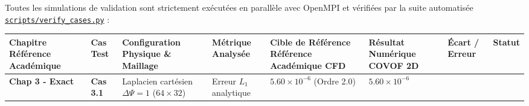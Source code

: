 \documentclass[
  french,
]{article}
\newcounter{none} %
\begin{document}
Toutes les simulations de validation sont strictement exécutées en
parallèle avec OpenMPI et vérifiées par la suite automatisée
\href{scripts/verify_cases.py}{\texttt{scripts/verify\_cases.py}} :

{\def\LTcaptype{none} %
\begin{longtable}[]{@{}
  >{\raggedright\arraybackslash}p{}
  >{\raggedright\arraybackslash}p{}
  >{\raggedright\arraybackslash}p{}
  >{\raggedright\arraybackslash}p{}
  >{\raggedright\arraybackslash}p{}
  >{\raggedright\arraybackslash}p{}
  >{\raggedright\arraybackslash}p{}
  >{\centering\arraybackslash}p{}@{}}
\toprule\noalign{}
\begin{minipage}[b]{\linewidth}\raggedright
Chapitre Référence Académique
\end{minipage} & \begin{minipage}[b]{\linewidth}\raggedright
Cas Test
\end{minipage} & \begin{minipage}[b]{\linewidth}\raggedright
Configuration Physique \& Maillage
\end{minipage} & \begin{minipage}[b]{\linewidth}\raggedright
Métrique Analysée
\end{minipage} & \begin{minipage}[b]{\linewidth}\raggedright
Cible de Référence Référence Académique CFD
\end{minipage} & \begin{minipage}[b]{\linewidth}\raggedright
Résultat Numérique COVOF 2D
\end{minipage} & \begin{minipage}[b]{\linewidth}\raggedright
Écart / Erreur
\end{minipage} & \begin{minipage}[b]{\linewidth}\centering
Statut
\end{minipage} \\
\midrule\noalign{}
\endhead
\bottomrule\noalign{}
\endlastfoot
\textbf{Chap 3 - Exact} & \textbf{Cas 3.1} & Laplacien cartésien
\(\Delta \Psi = 1\) (\(64 \times 32\)) & Erreur \(L_1\) analytique &
\(5.60 \times 10^{-6}\) (Ordre 2.0) & \(5.60 \times 10^{-6}\) &

\end{longtable}}
\end{document}

